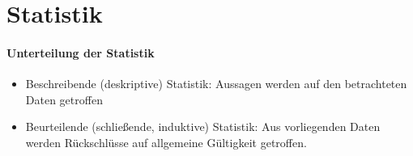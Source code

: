 \section{Statistik}
\paragraph{Unterteilung der Statistik}
\begin{itemize}
	\item Beschreibende (deskriptive) Statistik: Aussagen werden auf den betrachteten Daten getroffen
	\item Beurteilende (schließende, induktive) Statistik: Aus vorliegenden Daten werden Rückschlüsse auf allgemeine Gültigkeit getroffen.  
\end{itemize}